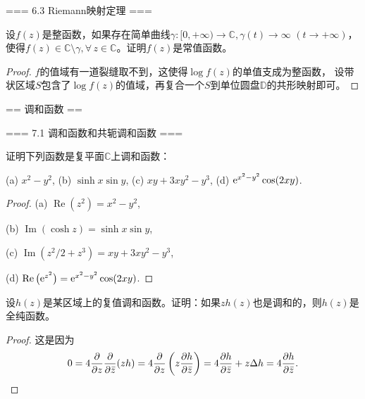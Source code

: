 === 6.3 Riemann映射定理 ===
\begin{1}
    设$f(z)$是整函数，如果存在简单曲线$\gamma:[0,+\infty)\to\mathbb{C},\gamma(t)\to\infty$ $(t\to+\infty)$，
    使得$f(z)\in\mathbb{C}\setminus\gamma,\forall\,z\in\mathbb{C}$。证明$f(z)$是常值函数。
\end{1}
\begin{proof}
    $f$的值域有一道裂缝取不到，这使得$\log f(z)$的单值支成为整函数，
    设带状区域$S$包含了$\log f(z)$的值域，再复合一个$S$到单位圆盘$\mathbb{D}$的共形映射即可。
\end{proof}

== 调和函数 ==

=== 7.1 调和函数和共轭调和函数 ===
\begin{1}
    证明下列函数是复平面$\mathbb{C}$上调和函数：

    (a) $x^2-y^2$, \quad (b) $\sinh x\sin y$, \quad (c) $xy+3xy^2-y^3$, \quad (d) ${\rm e}^{x^2-y^2}\cos(2xy)$.
\end{1}
\begin{proof}
    (a) $\operatorname{Re}(z^2)=x^2-y^2$,

    (b) $\operatorname{Im}(\cosh z)=\sinh x\sin y$,

    (c) $\operatorname{Im}(z^2/2+z^3)=xy+3xy^2-y^3$,

    (d) $\operatorname{Re}\big({\rm e}^{z^2}\big)={\rm e}^{x^2-y^2}\cos(2xy)$.
\end{proof}

\begin{2}
    设$h(z)$是某区域上的复值调和函数。证明：如果$zh(z)$也是调和的，则$h(z)$是全纯函数。
\end{2}
\begin{proof}
    这是因为
    \[0=4\frac{\partial}{\partial z}\frac{\partial}{\partial \bar{z}}(zh)
    =4\frac{\partial}{\partial z}\left(z\frac{\partial h}{\partial \bar{z}}\right)
    =4\frac{\partial h}{\partial \bar{z}}+z\Delta h
    =4\frac{\partial h}{\partial \bar{z}}.\qedhere\]
\end{proof}

